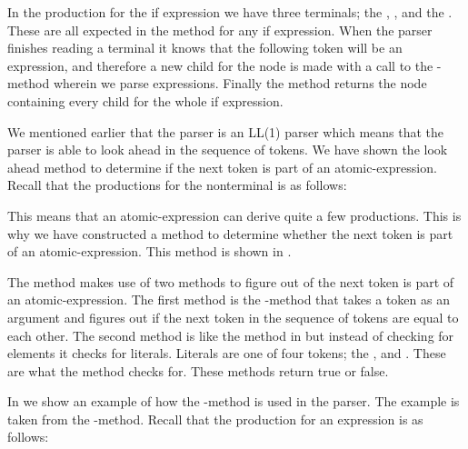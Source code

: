 In the production for the if expression we have three terminals; the , , and the . These are all expected in the method for any if expression. When the parser finishes reading a terminal it knows that the following token will be an expression, and therefore a new child for the node is made with a call to the -method wherein we parse expressions. Finally the method returns the node containing every child for the whole if expression.

We mentioned earlier that the parser is an LL(1) parser which means that the parser is able to look ahead in the sequence of tokens. We have shown the look ahead method to determine if the next token is part of an atomic-expression. Recall that the productions for the nonterminal is as follows:

\begin{ebnf}
\end{ebnf}

This means that an atomic-expression can derive quite a few productions. This is why we have constructed a method to determine whether the next token is part of an atomic-expression. This method is shown in .



The method  makes use of two methods to figure out of the next token is part of an atomic-expression. The first method is the -method that takes a token as an argument and figures out if the next token in the sequence of tokens are equal to each other. The second method is like the method in  but instead of checking for elements it checks for literals. Literals are one of four tokens; the , and . These are what the method  checks for. These methods return true or false.

In  we show an example of how the -method is used in the parser. The example is taken from the -method. Recall that the production for an expression is as follows:

